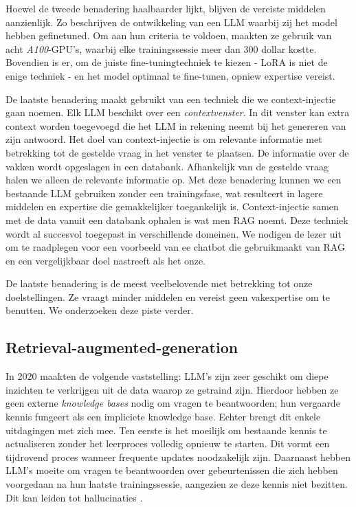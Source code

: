Hoewel de tweede benadering haalbaarder lijkt, blijven de vereiste middelen aanzienlijk. Zo beschrijven \textcite{Chiang2023} de ontwikkeling van een LLM waarbij zij het model hebben gefinetuned. Om aan hun criteria te voldoen, maakten ze gebruik van acht \textit{A100}-GPU's, waarbij elke trainingssessie meer dan 300 dollar kostte. Bovendien is er, om de juiste fine-tuningtechniek te kiezen - LoRA is niet de enige techniek - en het model optimaal te fine-tunen, opniew expertise vereist.

De laatste benadering maakt gebruikt van een techniek die we context-injectie gaan noemen. Elk LLM beschikt over een \textit{contextvenster}. In dit venster kan extra context worden toegevoegd die het LLM in rekening neemt bij het genereren van zijn antwoord. Het doel van context-injectie is om relevante informatie met betrekking tot de gestelde vraag in het venster te plaatsen. De informatie over de vakken wordt opgeslagen in een databank. Afhankelijk van de gestelde vraag halen we alleen de relevante informatie op. Met deze benadering kunnen we een bestaande LLM gebruiken zonder een trainingsfase, wat resulteert in lagere middelen en expertise die gemakkelijker toegankelijk is. Context-injectie samen met de data vanuit een databank ophalen is wat men \acrfull{RAG} noemt. Deze techniek wordt al succesvol toegepast in verschillende domeinen. We nodigen de lezer uit om \textcite{Wang2024} te raadplegen voor een voorbeeld van ee chatbot die gebruikmaakt van RAG en een vergelijkbaar doel nastreeft als het onze. 

De laatste benadering is de meest veelbelovende met betrekking tot onze doelstellingen. Ze vraagt minder middelen en vereist geen vakexpertise om te benutten. We onderzoeken deze piste verder.

\subsection{Retrieval-augmented-generation}%
\label{subsec:rag}

In 2020 maakten \textcite{Lewis2020} de volgende vaststelling: LLM's zijn zeer geschikt om diepe inzichten te verkrijgen uit de data waarop ze getraind zijn. Hierdoor hebben ze geen externe \textit{knowledge bases} nodig om vragen te beantwoorden; hun vergaarde kennis fungeert als een impliciete knowledge base. Echter brengt dit enkele uitdagingen met zich mee. Ten eerste is het moeilijk om bestaande kennis te actualiseren zonder het leerproces volledig opnieuw te starten. Dit vormt een tijdrovend proces wanneer frequente updates noodzakelijk zijn. Daarnaast hebben LLM's moeite om vragen te beantwoorden over gebeurtenissen die zich hebben voorgedaan na hun laatste trainingssessie, aangezien ze deze kennis niet bezitten. Dit kan leiden tot hallucinaties \autocite{Gao2023}.


